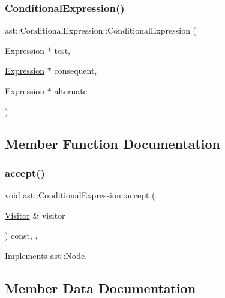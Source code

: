 \subsubsection{\texorpdfstring{Conditional\+Expression()}{ConditionalExpression()}}
{\footnotesize\ttfamily ast\+::\+Conditional\+Expression\+::\+Conditional\+Expression (\begin{DoxyParamCaption}\item[{\hyperlink{structast_1_1_expression}{Expression} $\ast$}]{test,  }\item[{\hyperlink{structast_1_1_expression}{Expression} $\ast$}]{consequent,  }\item[{\hyperlink{structast_1_1_expression}{Expression} $\ast$}]{alternate }\end{DoxyParamCaption})\hspace{0.3cm}{\ttfamily [inline]}}



\subsection{Member Function Documentation}
\mbox{\label{structast_1_1_conditional_expression_a97fb13e04440b153cc6c1ded95b35e40}} 
\subsubsection{\texorpdfstring{accept()}{accept()}}
{\footnotesize\ttfamily void ast\+::\+Conditional\+Expression\+::accept (\begin{DoxyParamCaption}\item[{\hyperlink{structast_1_1_visitor}{Visitor} \&}]{visitor }\end{DoxyParamCaption}) const\hspace{0.3cm}{\ttfamily [inline]}, {\ttfamily [override]}, {\ttfamily [virtual]}}



Implements \hyperlink{structast_1_1_node_abc089ee6caaf06a4445ebdd8391fdebc}{ast\+::\+Node}.



\subsection{Member Data Documentation}
\mbox{\label{structast_1_1_conditional_expression_a26b4ef799945f3670e759c4d396b3fb2}} 
